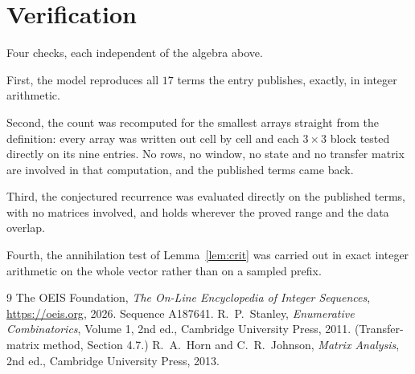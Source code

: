 \documentclass[11pt,a4paper]{article}
\theoremstyle{plain}
\theoremstyle{definition}
\begin{document}
\section{Verification}

Four checks, each independent of the algebra above.

First, the model reproduces all $17$ terms the entry publishes, exactly, in integer
arithmetic.

Second, the count was recomputed for the smallest arrays straight from the definition: every
array was written out cell by cell and each $3\times3$ block tested directly on its nine
entries. No rows, no window, no state and no transfer matrix are involved in that computation,
and the published terms came back.

Third, the conjectured recurrence was evaluated directly on the published terms, with no
matrices involved, and holds wherever the proved range and the data overlap.

Fourth, the annihilation test of Lemma~\ref{lem:crit} was carried out in exact integer
arithmetic on the whole vector rather than on a sampled prefix.

\begin{thebibliography}{9}
 The OEIS Foundation, \emph{The On-Line Encyclopedia of Integer
Sequences}, \url{https://oeis.org}, 2026. Sequence A187641.
 R.~P.~Stanley, \emph{Enumerative Combinatorics}, Volume 1, 2nd ed.,
Cambridge University Press, 2011. (Transfer-matrix method, Section 4.7.)
 R.~A.~Horn and C.~R.~Johnson, \emph{Matrix Analysis}, 2nd ed., Cambridge
University Press, 2013.
\end{thebibliography}
\end{document}
